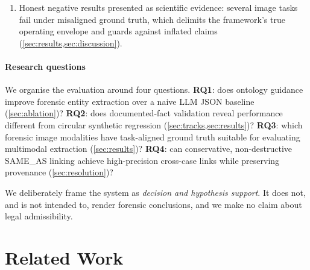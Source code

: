 \documentclass[conference]{IEEEtran}
\newcommand{\rel}[1]{\textup{\MakeUppercase{#1}}}
\newcommand{\node}[1]{\texttt{#1}}
\begin{document}
\begin{enumerate}[leftmargin=1.4em,itemsep=2pt,topsep=2pt]
NL-to-graph querying (an ablation shows grounding lifts answer correctness
$0.04\!\to\!0.67$ and cuts schema hallucination $0.96\!\to\!0.04$ vs.\ naive
LLM-to-Cypher, \cref{tab:queryabl}), evidence-chain hypothesis support, and a
temporal-reconstruction module over recovered dated events
(\node{TimeEvent} $\mathrm{F1}=0.88$) (\cref{sec:retrieval,sec:temporal}).
\item Honest negative results presented as scientific evidence: several image
tasks fail under misaligned ground truth, which delimits the framework's true
operating envelope and guards against inflated claims
(\cref{sec:results,sec:discussion}).
\end{enumerate}

\paragraph*{Research questions} We organise the evaluation around four questions.
\textbf{RQ1}: does ontology guidance improve forensic entity extraction over a
naive LLM JSON baseline (\cref{sec:ablation})? \textbf{RQ2}: does documented-fact
validation reveal performance different from circular synthetic regression
(\cref{sec:tracks,sec:results})? \textbf{RQ3}: which forensic image modalities
have task-aligned ground truth suitable for evaluating multimodal extraction
(\cref{sec:results})? \textbf{RQ4}: can conservative, non-destructive
\rel{same\_as} linking achieve high-precision cross-case links while preserving
provenance (\cref{sec:resolution})?

We deliberately frame the system as \emph{decision and hypothesis support}. It
does not, and is not intended to, render forensic conclusions, and we make no
claim about legal admissibility.

\section{Related Work}
\label{sec:related}
\end{document}
